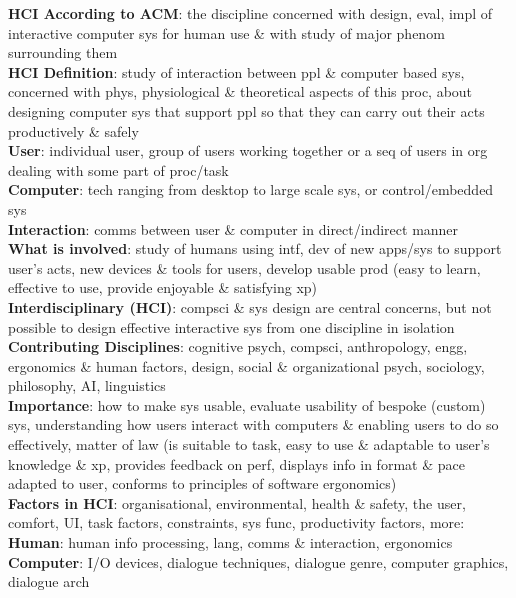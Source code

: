 \documentclass[a4paper]{article}
\begin{document}
    \tiny
    \begin{multicols}{3}
        \noindent\textbf{HCI According to ACM}: the discipline concerned with design, eval, impl of interactive computer sys for human use \& with study of major phenom surrounding them\\
        \textbf{HCI Definition}: study of interaction between ppl \& computer based sys, concerned with phys, physiological \& theoretical aspects of this proc, about designing computer sys that support ppl so that they can carry out their acts productively \& safely\\
        \textbf{User}: individual user, group of users working together or a seq of users in org dealing with some part of proc/task\\
        \textbf{Computer}: tech ranging from desktop to large scale sys, or control/embedded sys\\
        \textbf{Interaction}: comms between user \& computer in direct/indirect manner\\
        \textbf{What is involved}: study of humans using intf, dev of new apps/sys to support user's acts, new devices \& tools for users, develop usable prod (easy to learn, effective to use, provide enjoyable \& satisfying xp)\\
        \textbf{Interdisciplinary (HCI)}: compsci \& sys design are central concerns, but not possible to design effective interactive sys from one discipline in isolation\\
        \textbf{Contributing Disciplines}: cognitive psych, compsci, anthropology, engg, ergonomics \& human factors, design, social \& organizational psych, sociology, philosophy, AI, linguistics\\
        \textbf{Importance}: how to make sys usable, evaluate usability of bespoke (custom) sys, understanding how users interact with computers \& enabling users to do so effectively, matter of law (is suitable to task, easy to use \& adaptable to user's knowledge \& xp, provides feedback on perf, displays info in format \& pace adapted to user, conforms to principles of software ergonomics)\\
        \textbf{Factors in HCI}: organisational, environmental, health \& safety, the user, comfort, UI, task factors, constraints, sys func, productivity factors, more:\\
        \textbf{Human}: human info processing, lang, comms \& interaction, ergonomics\\
        \textbf{Computer}: I/O devices, dialogue techniques, dialogue genre, computer graphics, dialogue arch\\

\end{multicols}
\end{document}
